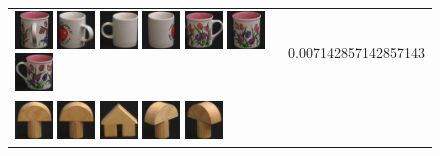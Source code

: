 \begin{figure}[!bp]
\begin{tabular}{m{11cm} | m{3cm} |}
\includegraphics[width=1cm]{coil/beeld-11.eps}
\includegraphics[width=1cm]{coil/beeld-40.eps}
\includegraphics[width=1cm]{coil/beeld-37.eps}
\includegraphics[width=1cm]{coil/beeld-38.eps}
\includegraphics[width=1cm]{coil/beeld-6.eps}
\includegraphics[width=1cm]{coil/beeld-8.eps}
\includegraphics[width=1cm]{coil/beeld-7.eps}
& {\scriptsize 0.007142857142857143}
\\
\includegraphics[width=1cm]{coil/beeld-0.eps}
\includegraphics[width=1cm]{coil/beeld-1.eps}
\includegraphics[width=1cm]{coil/beeld-42.eps}
\includegraphics[width=1cm]{coil/beeld-3.eps}
\includegraphics[width=1cm]{coil/beeld-4.eps}

\end{tabular}
\end{figure}
